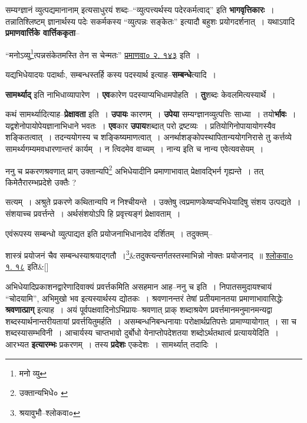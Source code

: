 \documentclass[article,12pt,a4paper]{memoir}
\begin{document}
	  \pstart सम्यग्ज्ञानं व्युत्पद्यमानानाम् इत्यसाधुरयं शब्दः--“व्युत्पत्त्यर्थस्य पदेरकर्मत्वाद्” इति \textbf{भागवृत्तिकारः} । तन्नातिश्लिष्टम् ज्ञानार्थस्य पदेः सकर्मकस्य “व्युत्पन्नः सङ्केतः” इत्यादौ बहुशः प्रयोगदर्शनात् । यथाऽवादि \textbf{प्रमाणवार्त्तिके वार्त्तिककृता}--
	\pend
      

	  \pstart “मनोऽव्यु\footnote{मनो व्यु}त्पन्नसंकेतमस्ति तेन स चेन्मतः” \href{http://http://sarit.indology.info/?cref=pv.2.143}{प्रमाणवा० २. १४३} इति ।
	\pend
      

	  \pstart यद्यभिधेयादयः पदार्थाः, सम्बन्धस्तर्हि कस्य पदस्यार्थ इत्याह--\textbf{सम्बन्धे}त्यादि ।
	\pend
      

	  \pstart \textbf{सामर्थ्याद्} इति नाभिधाव्यापारेण । \textbf{एव}कारेण पदस्याप्यभिधामपोहति । \textbf{तु}शब्दः केवलमित्यस्यार्थे ।
	\pend
      

	  \pstart कथं सामर्थ्यादित्याह--\textbf{प्रेक्षावता} इति । \textbf{उपायः} कारणम् । \textbf{उपेया} सम्यग्ज्ञानव्युत्पत्तिः साध्या । तयो\textbf{र्भावः} । यद्वशेनोपायोपेयज्ञानाभिधाने भवतः । \textbf{एव}कार \textbf{उपाय}शब्दात् परो द्रष्टव्यः । प्रतियोगिनोपायायोगस्यैव शङ्कितत्वात् । तदन्ययोगस्य च शङ्किष्यमाणत्वात् । अनर्थाशङ्कोपस्थापितान्ययोगनिरासे तु कर्त्तव्ये सामर्थ्यगम्यमवधारणान्तरं कार्यम् । न त्विदमेव वाच्यम् । नान्य इति च नान्य एवेत्यवसेयम् ।
	\pend
      \leavevmode{}
	  \bigskip
	  \begingroup
	

	  \pstart ननु च प्रकरणश्रवणात् प्राग् उक्तान्यपि\footnote{उक्तान्यभिधे० \cite{dp-msB}} अभिधेयादीनि प्रमाणाभावात् प्रेक्षावद्भिर्न गृह्यन्ते । तत् किमेतैरारम्भप्रदेशे उक्तैः ?
	\pend
       

	  \pstart सत्यम् । अश्रुते प्रकरणे कथितान्यपि न निश्चीयन्ते । उक्तेषु त्वप्रमाणकेष्वप्यभिधेयादिषु संशय उत्पद्यते । संशयाच्च प्रवर्त्तन्ते । अर्थसंशयोऽपि हि प्रवृत्त्यङ्गं प्रेक्षावताम् ।
	\pend
      
	  \endgroup
	

	  \pstart एवंरूपस्य सम्बन्धो व्युत्पाद्यत इति प्रयोजनाभिधानादेव दर्शितम् । तदुक्तम्--
	\pend
      
	  \bigskip
	  \begingroup
	
	    
	    \stanza[\smallbreak]
	शास्त्रं प्रयोजनं चैव सम्बन्धस्याश्रयाद्गतौ ।\footnote{श्रयावुभौ--श्लोकवा०}&तदुक्त्यन्तर्गतस्तस्माभिन्नो नोक्तः प्रयोजनाद् ॥ \href{http://http://sarit.indology.info/?cref=śv.1.18}{श्लोकवा० १. १८} इति\&[\smallbreak]


	
	  \endgroup
	

	  \pstart अभिधेयादिप्रकाशनद्वारेणादिवाक्यं प्रवर्त्तकमिति असहमान आह--ननु च इति । निपातसमुदायश्चायं “चोदयामि”, अभिमुखो भव इत्यस्यार्थस्य द्योतकः । श्रवणानन्तरं तेषां प्रतीयमानतया प्रमाणाभावासिद्धेः \textbf{श्रवणात्प्राग्} इत्याह । अयं पूर्वपक्षवादिनोऽभिप्रायः--श्रवणात् प्राक् शब्दाश्रयेण प्रवर्त्तमानमनुमानमन्यद्वा शब्दस्यार्थनान्तरीयतायां प्रवर्त्तयितुमर्हति । असम्बन्धनिबन्धनायाः परोक्षार्थप्रतिपत्तेः प्रामाण्यायोगात् । सा च शब्दस्यासम्भविनी । आचार्यस्य चाप्तभावो दुर्बोधो येनाप्तोपदेशतया शब्दोऽर्थतथात्वं प्रत्याययेदिति । आरभ्यत \textbf{इत्यारम्भः} प्रकरणम् । तस्य \textbf{प्रदेशः} एकदेशः । सामर्थ्यात् तदादिः ।
	\pend
      
\end{document}
